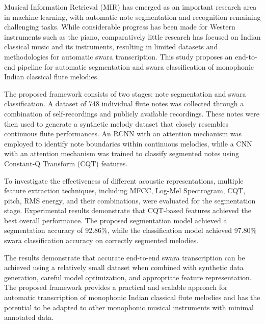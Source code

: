 Musical Information Retrieval (MIR) has emerged as an important research area in machine learning, with automatic note segmentation and recognition remaining challenging tasks. While considerable progress has been made for Western instruments such as the piano, comparatively little research has focused on Indian classical music and its instruments, resulting in limited datasets and methodologies for automatic swara transcription. This study proposes an end-to-end pipeline for automatic segmentation and swara classification of monophonic Indian classical flute melodies.

The proposed framework consists of two stages: note segmentation and swara classification. A dataset of 748 individual flute notes was collected through a combination of self-recordings and publicly available recordings. These notes were then used to generate a synthetic melody dataset that closely resembles continuous flute performances. An RCNN with an attention mechanism was employed to identify note boundaries within continuous melodies, while a CNN with an attention mechanism was trained to classify segmented notes using Constant-Q Transform (CQT) features.

To investigate the effectiveness of different acoustic representations, multiple feature extraction techniques, including MFCC, Log-Mel Spectrogram, CQT, pitch, RMS energy, and their combinations, were evaluated for the segmentation stage. Experimental results demonstrate that CQT-based features achieved the best overall performance. The proposed segmentation model achieved a segmentation accuracy of 92.86\%, while the classification model achieved 97.80\% swara classification accuracy on correctly segmented melodies.

The results demonstrate that accurate end-to-end swara transcription can be achieved using a relatively small dataset when combined with synthetic data generation, careful model optimization, and appropriate feature representation. The proposed framework provides a practical and scalable approach for automatic transcription of monophonic Indian classical flute melodies and has the potential to be adapted to other monophonic musical instruments with minimal annotated data.
